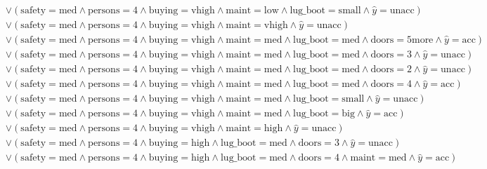 \begin{scriptsize}
\[\begin{aligned}
  \\ & \lor (\text{safety}=\text{med} \land \text{persons}=\text{4} \land \text{buying}=\text{vhigh} \land \text{maint}=\text{low} \land \text{lug_boot}=\text{small} \land \hat{y}=\text{unacc})
  \\ & \lor (\text{safety}=\text{med} \land \text{persons}=\text{4} \land \text{buying}=\text{vhigh} \land \text{maint}=\text{vhigh} \land \hat{y}=\text{unacc})
  \\ & \lor (\text{safety}=\text{med} \land \text{persons}=\text{4} \land \text{buying}=\text{vhigh} \land \text{maint}=\text{med} \land \text{lug_boot}=\text{med} \land \text{doors}=\text{5more} \land \hat{y}=\text{acc})
  \\ & \lor (\text{safety}=\text{med} \land \text{persons}=\text{4} \land \text{buying}=\text{vhigh} \land \text{maint}=\text{med} \land \text{lug_boot}=\text{med} \land \text{doors}=\text{3} \land \hat{y}=\text{unacc})
  \\ & \lor (\text{safety}=\text{med} \land \text{persons}=\text{4} \land \text{buying}=\text{vhigh} \land \text{maint}=\text{med} \land \text{lug_boot}=\text{med} \land \text{doors}=\text{2} \land \hat{y}=\text{unacc})
  \\ & \lor (\text{safety}=\text{med} \land \text{persons}=\text{4} \land \text{buying}=\text{vhigh} \land \text{maint}=\text{med} \land \text{lug_boot}=\text{med} \land \text{doors}=\text{4} \land \hat{y}=\text{acc})
  \\ & \lor (\text{safety}=\text{med} \land \text{persons}=\text{4} \land \text{buying}=\text{vhigh} \land \text{maint}=\text{med} \land \text{lug_boot}=\text{small} \land \hat{y}=\text{unacc})
  \\ & \lor (\text{safety}=\text{med} \land \text{persons}=\text{4} \land \text{buying}=\text{vhigh} \land \text{maint}=\text{med} \land \text{lug_boot}=\text{big} \land \hat{y}=\text{acc})
  \\ & \lor (\text{safety}=\text{med} \land \text{persons}=\text{4} \land \text{buying}=\text{vhigh} \land \text{maint}=\text{high} \land \hat{y}=\text{unacc})
  \\ & \lor (\text{safety}=\text{med} \land \text{persons}=\text{4} \land \text{buying}=\text{high} \land \text{lug_boot}=\text{med} \land \text{doors}=\text{3} \land \hat{y}=\text{unacc})
  \\ & \lor (\text{safety}=\text{med} \land \text{persons}=\text{4} \land \text{buying}=\text{high} \land \text{lug_boot}=\text{med} \land \text{doors}=\text{4} \land \text{maint}=\text{med} \land \hat{y}=\text{acc})

\end{aligned}\]
\end{scriptsize}
